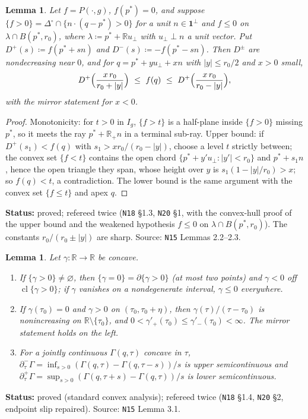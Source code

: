 \documentclass[11pt]{article}
\newtheorem{lemma}[theorem]{Lemma}
\theoremstyle{definition}
\theoremstyle{remark}
\newcommand{\R}{\mathbb R}
\newcommand{\one}{\mathbf 1}
\newcommand{\Di}{\Delta^{\circ}}
\newcommand{\cl}{\operatorname{cl}}
\newcommand{\src}[1]{\texttt{#1}}
\newcommand{\status}[1]{\par\smallskip\noindent\textbf{Status:} #1\par\smallskip}
\begin{document}
\begin{lemma}\label{lem:sandwich}
Let $f=P(\cdot,g)$, $f(p^*)=0$, and suppose $\{f>0\}=\Di\cap\{n\cdot(q-p^*)>0\}$ for a unit $n\in\one^\perp$ and $f\le0$ on $\lambda\cap B(p^*,r_0)$, where $\lambda\coloneqq p^*+\R u_\perp$ with $u_\perp\perp n$ a unit vector. Put $D^+(s)\coloneqq f(p^*+sn)$ and $D^-(s)\coloneqq-f(p^*-sn)$. Then $D^\pm$ are nondecreasing near $0$, and for $q=p^*+yu_\perp+xn$ with $|y|\le r_0/2$ and $x>0$ small,
\[
D^+\Bigl(\frac{x\,r_0}{r_0+|y|}\Bigr)\ \le\ f(q)\ \le\ D^+\Bigl(\frac{x\,r_0}{r_0-|y|}\Bigr),
\]
with the mirror statement for $x<0$.
\end{lemma}
\begin{proof}
Monotonicity: for $t>0$ in $I_g$, $\{f>t\}$ is a half-plane inside $\{f>0\}$ missing $p^*$, so it meets the ray $p^*+\R_+n$ in a terminal sub-ray. Upper bound: if $D^+(s_1)<f(q)$ with $s_1>xr_0/(r_0-|y|)$, choose a level $t$ strictly between; the convex set $\{f<t\}$ contains the open chord $\{p^*+y'u_\perp:|y'|<r_0\}$ and $p^*+s_1n$, hence the open triangle they span, whose height over $y$ is $s_1(1-|y|/r_0)>x$; so $f(q)<t$, a contradiction. The lower bound is the same argument with the convex set $\{f\le t\}$ and apex $q$.
\end{proof}
\status{proved; refereed twice (\src{N18} \S1.3, \src{N20} \S1, with the convex-hull proof of the upper bound and the weakened hypothesis $f\le0$ on $\lambda\cap B(p^*,r_0)$). The constants $r_0/(r_0\pm|y|)$ are sharp. Source: \src{N15} Lemmas 2.2--2.3.}

\begin{lemma}\label{lem:caps}
Let $\gamma:\R\to\R$ be concave.
\begin{enumerate}[leftmargin=*,label=(\alph*)]
\item If $\{\gamma>0\}\ne\varnothing$, then $\{\gamma=0\}=\partial\{\gamma>0\}$ (at most two points) and $\gamma<0$ off $\cl\{\gamma>0\}$; if $\gamma$ vanishes on a nondegenerate interval, $\gamma\le0$ everywhere.
\item If $\gamma(\tau_0)=0$ and $\gamma>0$ on $(\tau_0,\tau_0+\eta)$, then $\gamma(\tau)/(\tau-\tau_0)$ is nonincreasing on $\R\setminus\{\tau_0\}$, and $0<\gamma'_+(\tau_0)\le\gamma'_-(\tau_0)<\infty$. The mirror statement holds on the left.
\item For a jointly continuous $\Gamma(q,\tau)$ concave in $\tau$, $\partial^-_\tau\Gamma=\inf_{s>0}(\Gamma(q,\tau)-\Gamma(q,\tau-s))/s$ is upper semicontinuous and $\partial^+_\tau\Gamma=\sup_{s>0}(\Gamma(q,\tau+s)-\Gamma(q,\tau))/s$ is lower semicontinuous.
\end{enumerate}
\end{lemma}
\status{proved (standard convex analysis); refereed twice (\src{N18} \S1.4, \src{N20} \S2, endpoint slip repaired). Source: \src{N15} Lemma 3.1.}
\end{document}
